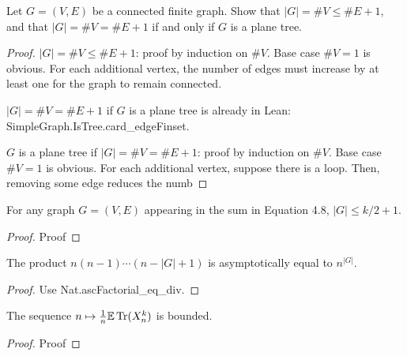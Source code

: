 



\begin{proposition}%
  \label{prop:4_3_1}
  \notready
  Let $G=(V,E)$ be a connected finite graph. Show that $|G|=\#V\le \#E+1$, and that $|G|=\#V=\#E+1$ if and only if $G$ is a plane tree.
\end{proposition}

\begin{proof}
  \notready
  $|G|= \#V\le \#E+1$: proof by induction on $\#V$. Base case $\#V = 1$ is obvious. For each additional vertex, the number of edges must increase by at least one for the graph to remain connected.

  $|G|=\#V=\#E+1$ if $G$ is a plane tree is already in Lean: SimpleGraph.IsTree.card\_edgeFinset.

  $G$ is a plane tree if $|G|=\#V=\#E+1$: proof by induction on $\#V$. Base case $\#V = 1$ is obvious. For each additional vertex, suppose there is a loop. Then, removing some edge reduces the numb
\end{proof}


\begin{lemma}
  \label{lemma:vertex_bound}
  \notready
  For any graph $G = (V, E)$ appearing in the sum in Equation 4.8, $|G| \le k/2 + 1$.
\end{lemma}

\begin{proof}
  \notready
  Proof
\end{proof}



\begin{lemma}
  \label{lemma:factorial_product}
  \notready
  The product $n(n-1)\cdots (n-|G|+1)$ is asymptotically equal to $n^{|G|}$.

\end{lemma}

\begin{proof}
  \notready
  Use Nat.ascFactorial\_eq\_div.
\end{proof}



\begin{lemma}
  \label{lemma:bounded_map}
  \notready
  The sequence $n\mapsto \frac1n{\mathbb{E}}\operatorname{Tr}(X_n^k)$ is bounded.
\end{lemma}

\begin{proof}
  \notready
  Proof
\end{proof}



